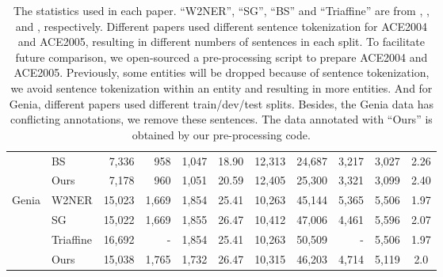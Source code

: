 \documentclass[11pt]{article}
\begin{document}
\begin{table*}[]
\begin{tabular}{clrrrcrrrrc}
                           & BS    & 7,336                        & 958                       & 1,047                       & 18.90                         & 12,313                       & 24,687                       & 3,217                      & 3,027                       & 2.26                         \\
                           & Ours  & 7,178                        & 960                       & 1,051                       & 20.59                        & 12,405                       & 25,300                       & 3,321                      & 3,099                       & 2.40                          \\
                           \midrule
  \multirow{4}{*}{Genia}   & W2NER & 15,023 & 1,669 & 1,854 & 25.41 & 10,263 & 45,144 & 5,365 & 5,506 & 1.97 \\
                           & SG    & 15,022 & 1,669 & 1,855 & 26.47 & 10,412 & 47,006 & 4,461 & 5,596 & 2.07                       \\
                           & Triaffine    & 16,692 & - & 1,854 & 25.41 & 10,263 & 50,509 & - & 5,506 & 1.97                       \\

& Ours & 15,038 & 1,765 & 1,732 & 26.47 & 10,315 & 46,203 & 4,714 & 5,119 & 2.0 \\
  \bottomrule                          
  \end{tabular}
  \caption{The statistics used in each paper. ``W2NER''\protect\footnotemark, ``SG'', ``BS'' and ``Triaffine'' are from \cite{DBLP:conf/aaai/Li00WZTJL22}, \cite{DBLP:conf/acl/WanR0022}, \cite{DBLP:conf/acl/Zhu022} and \cite{DBLP:conf/acl/0002THH22}, respectively. Different papers used different sentence tokenization for ACE2004 and ACE2005, resulting in different numbers of sentences in each split. To facilitate future comparison, we open-sourced a pre-processing script to prepare ACE2004 and ACE2005. Previously, some entities will be dropped because of sentence tokenization, we avoid sentence tokenization within an entity and resulting in more entities. And for Genia, different papers used different train/dev/test splits. Besides, the Genia data has conflicting annotations, we remove these sentences. The data annotated with ``Ours'' is obtained by our pre-processing code.}
  \label{tab:statistics}
\end{table*}
\end{document}
